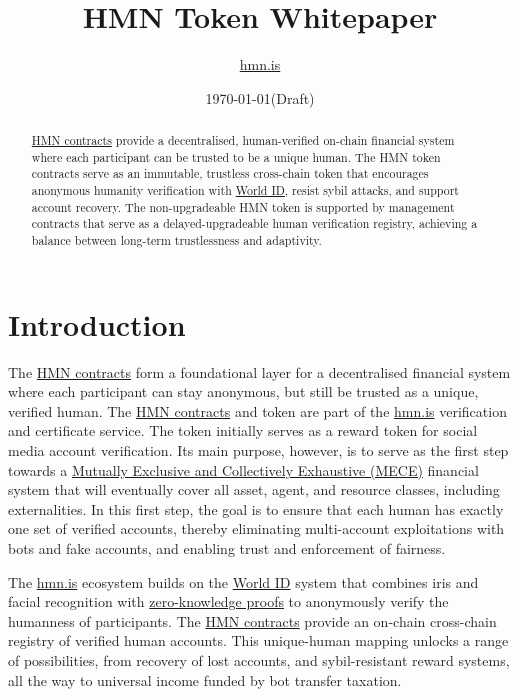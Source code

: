\documentclass[12pt,a4paper]{article}
\title{HMN Token Whitepaper}
\author{\href{https://hmn.is}{hmn.is}}
\date{\today\hspace{1em}(Draft)}
\begin{document}
\maketitle

\begin{abstract}
\href{https://github.com/hmn-is/hmn-contracts}{HMN contracts} provide a decentralised, human-verified on-chain financial system where each participant can be trusted to be a unique human.
The HMN token contracts serve as an immutable, trustless cross-chain token that encourages anonymous humanity verification with \href{https://world.org/world-id}{World ID}, resist sybil attacks, and support account recovery.
The non-upgradeable HMN token is supported by management contracts that serve as a delayed-upgradeable human verification registry, achieving a balance between long-term trustlessness and adaptivity.
\end{abstract}

\section{Introduction}
The \href{https://github.com/hmn-is/hmn-contracts}{HMN contracts} form a foundational layer for a decentralised financial system where each participant can stay anonymous, but still be trusted as a unique, verified human.
The \href{https://github.com/hmn-is/hmn-contracts}{HMN contracts} and token are part of the \href{https://hmn.is}{hmn.is} verification and certificate service. The token initially serves as a reward token for social media account verification.
Its main purpose, however, is to serve as the first step towards a \href{https://en.wikipedia.org/wiki/MECE_principle}{Mutually Exclusive and Collectively Exhaustive (MECE)} financial system that will eventually cover all asset, agent, and resource classes, including externalities.
In this first step, the goal is to ensure that each human has exactly one set of verified accounts, thereby eliminating multi-account exploitations with bots and fake accounts, and enabling trust and enforcement of fairness.

The \href{https://hmn.is}{hmn.is} ecosystem builds on the \href{https://world.org/world-id}{World ID} system that combines iris and facial recognition with \href{https://en.wikipedia.org/wiki/Zero-knowledge_proof}{zero-knowledge proofs} to anonymously verify the humanness of participants.
The \href{https://github.com/hmn-is/hmn-contracts}{HMN contracts} provide an on-chain cross-chain registry of verified human accounts.
This unique-human mapping unlocks a range of possibilities, from recovery of lost accounts, and sybil-resistant reward systems, all the way to universal income funded by bot transfer taxation.
\end{document}
